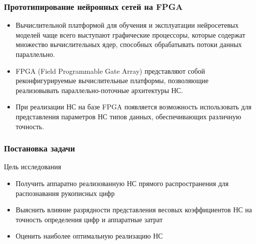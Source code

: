 \begin{frame}
\frametitle{Прототипирование нейронных сетей на FPGA}

    \begin{itemize}
        \item Вычислительной платформой для обучения и
        эксплуатации нейросетевых моделей чаще всего выступают графические процессоры,
        которые содержат множество вычислительных ядер, способных обрабатывать потоки данных
        параллельно. 
        \item FPGA (Field Programmable Gate Array) представляют собой реконфигурируемые вычислительные
        платформы, позволяющие реализовывать параллельно-поточные архитектуры НС.
        \item При реализации НС на базе FPGA появляется
        возможность использовать для представления параметров НС типов данных, обеспечивающих
        различную точность.
    \end{itemize}

\end{frame}

\begin{frame}
\frametitle{Постановка задачи}

\begin{block}{\centering Цель исследования}                
    \begin{itemize}\small
        \item Получить аппаратно реализованную НС прямого распространения для распознавания рукописных цифр
        \item Выяснить влияние разрядности представления весовых коэффициентов НС на точность определения цифр и аппаратные затрат
        \item Оценить наиболее оптимальную реализацию НС           
    \end{itemize}
\end{block}
\end{frame}
